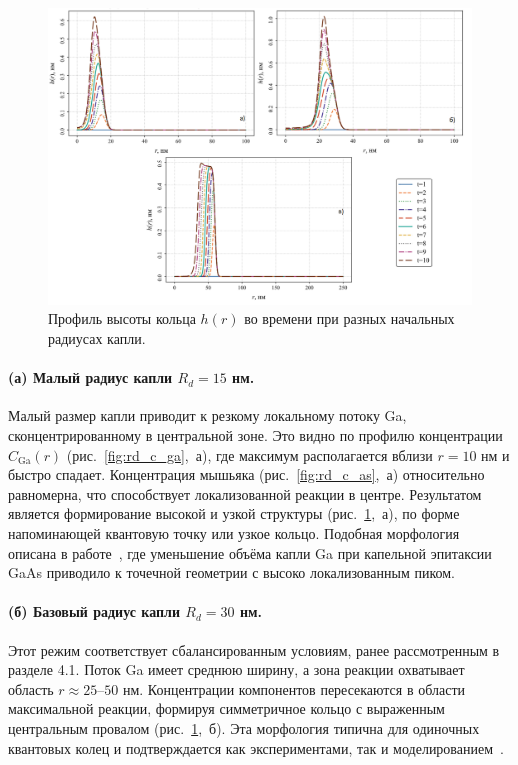 \documentclass[14pt,oneside]{extarticle}
\begin{document}
\begin{figure}
    \begin{center}
    \includegraphics[width=18cm]{images/h_t_3.png}
    \caption{\label{fig:rd_h} Профиль высоты кольца $h(r)$ во времени при разных начальных радиусах капли.}
    \end{center}
\end{figure}

\paragraph{(а) Малый радиус капли \(R_d = 15\) нм.}
Малый размер капли приводит к резкому локальному потоку Ga, сконцентрированному в центральной зоне. Это видно по профилю концентрации \(C_{\text{Ga}}(r)\) (рис.~\ref{fig:rd_c_ga},~а), где максимум располагается вблизи \(r = 10\) нм и быстро спадает. Концентрация мышьяка (рис.~\ref{fig:rd_c_as},~а) относительно равномерна, что способствует локализованной реакции в центре. Результатом является формирование высокой и узкой структуры (рис.~\ref{fig:rd_h},~а), по форме напоминающей квантовую точку или узкое кольцо. Подобная морфология описана в работе~\cite{kuroda2018tunable}, где уменьшение объёма капли Ga при капельной эпитаксии GaAs приводило к точечной геометрии с высоко локализованным пиком.

\paragraph{(б) Базовый радиус капли \(R_d = 30\) нм.}
Этот режим соответствует сбалансированным условиям, ранее рассмотренным в разделе 4.1. Поток Ga имеет среднюю ширину, а зона реакции охватывает область \(r \approx 25\text{–}50\) нм. Концентрации компонентов пересекаются в области максимальной реакции, формируя симметричное кольцо с выраженным центральным провалом (рис.~\ref{fig:rd_h},~б). Эта морфология типична для одиночных квантовых колец и подтверждается как экспериментами, так и моделированием~\cite{zhang2020morphology}.
\end{document}
